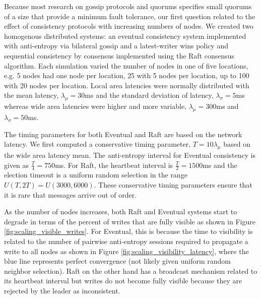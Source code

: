 \documentclass{article}
\begin{document}
Because most research on gossip protocols and quorums specifies small quorums of a size that provide a minimum fault tolerance, our first question related to the effect of consistency protocols with increasing numbers of nodes. We created two homogenous distributed systems: an eventual consistency system implemented with anti-entropy via bilateral gossip and a latest-writer wins policy and sequential consistency by consensus implemented using the Raft consensus algorithm. Each simulation varied the number of nodes in one of five locations, e.g. 5 nodes had one node per location, 25 with 5 nodes per location, up to 100 with 20 nodes per location. Local area latencies were normally distributed with the mean latency, $\lambda_{\mu}=30$ms and the standard deviation of latency, $\lambda_{\sigma}=5$ms whereas wide area latencies were higher and more variable, $\lambda_{\mu}=300$ms and $\lambda_{\sigma}=50$ms.

The timing parameters for both Eventual and Raft are based on the network latency. We first computed a conservative timing parameter, $T=10\lambda_{\mu}$ based on the wide area latency mean. The anti-entropy interval for Eventual consistency is given as $\frac {T} {4} = 750$ms. For Raft, the heartbeat interval is $\frac {T} {2} = 1500$ms and the election timeout is a uniform random selection in the range $U(T, 2T) = U(3000, 6000)$. These conservative timing parameters ensure that it is rare that messages arrive out of order.

As the number of nodes increases, both Raft and Eventual systems start to degrade in terms of the percent of writes that are fully visible as shown in Figure \ref{fig:scaling_visible_writes}. For Eventual, this is because the time to visibility is related to the number of pairwise anti-entropy sessions required to propagate a write to all nodes as shown in Figure \ref{fig:scaling_visibility_latency}, where the blue line represents perfect convergence (not likely given uniform random neighbor selection). Raft on the other hand has a broadcast mechanism related to its heartbeat interval but writes do not become fully visible because they are rejected by the leader as inconsistent.
\end{document}
